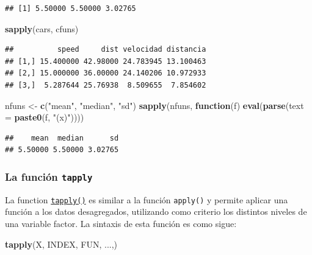 \documentclass[
]{book}
\newenvironment{Shaded}{\begin{snugshade}}{\end{snugshade}}
\newcommand{\AttributeTok}[1]{\textcolor[rgb]{0.13,0.29,0.53}{#1}}
\newcommand{\ControlFlowTok}[1]{\textcolor[rgb]{0.13,0.29,0.53}{\textbf{#1}}}
\newcommand{\FunctionTok}[1]{\textcolor[rgb]{0.13,0.29,0.53}{\textbf{#1}}}
\newcommand{\NormalTok}[1]{#1}
\newcommand{\OtherTok}[1]{\textcolor[rgb]{0.56,0.35,0.01}{#1}}
\newcommand{\StringTok}[1]{\textcolor[rgb]{0.31,0.60,0.02}{#1}}
\begin{document}
\begin{verbatim}
## [1] 5.50000 5.50000 3.02765
\end{verbatim}

\begin{Shaded}
\begin{Highlighting}[]
\FunctionTok{sapply}\NormalTok{(cars, cfuns)}
\end{Highlighting}
\end{Shaded}

\begin{verbatim}
##          speed     dist velocidad distancia
## [1,] 15.400000 42.98000 24.783945 13.100463
## [2,] 15.000000 36.00000 24.140206 10.972933
## [3,]  5.287644 25.76938  8.509655  7.854602
\end{verbatim}

\begin{Shaded}
\begin{Highlighting}[]
\NormalTok{nfuns }\OtherTok{\textless{}{-}} \FunctionTok{c}\NormalTok{(}\StringTok{"mean"}\NormalTok{, }\StringTok{"median"}\NormalTok{, }\StringTok{"sd"}\NormalTok{)}
\FunctionTok{sapply}\NormalTok{(nfuns, }\ControlFlowTok{function}\NormalTok{(f) }\FunctionTok{eval}\NormalTok{(}\FunctionTok{parse}\NormalTok{(}\AttributeTok{text =} \FunctionTok{paste0}\NormalTok{(f, }\StringTok{"(x)"}\NormalTok{))))}
\end{Highlighting}
\end{Shaded}

\begin{verbatim}
##    mean  median      sd 
## 5.50000 5.50000 3.02765
\end{verbatim}

\subsubsection{\texorpdfstring{La función \texttt{tapply}}{La función tapply}}\label{la-funciuxf3n-tapply}

La function \href{https://www.rdocumentation.org/packages/base/versions/3.6.1/topics/tapply}{\texttt{tapply()}} es
similar a la función \texttt{apply()} y permite aplicar una función a los datos desagregados,
utilizando como criterio los distintos niveles de una variable factor.
La sintaxis de esta función es como sigue:

\begin{Shaded}
\begin{Highlighting}[]
    \FunctionTok{tapply}\NormalTok{(X, INDEX, FUN, ...,)}
\end{Highlighting}
\end{Shaded}
\end{document}
